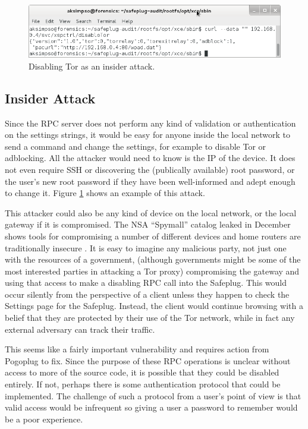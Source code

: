 \documentclass[conference]{IEEEtran}
\begin{document}
\begin{figure}
  \centering
  \includegraphics[width=.75\textwidth]{disabletor}
  \caption{Disabling Tor as an insider attack.}
  \label{disable}
\end{figure}

\subsection{Insider Attack}
Since the RPC server does not perform any kind of validation or authentication on the settings strings, it would be easy for anyone inside the local network to send a command and change the settings, for example to disable Tor or adblocking.  All the attacker would need to know is the IP of the device.  It does not even require SSH or discovering the (publically available) root password, or the user's new root password if they have been well-informed and adept enough to change it.  Figure \ref{disable} shows an example of this attack.

This attacker could also be any kind of device on the local network, or the local gateway if it is compromised.  The NSA ``Spymall'' catalog leaked in December shows tools for compromising a number of different devices and home routers are traditionally insecure \cite{spymall}.  It is easy to imagine any malicious party, not just one with the resources of a government, (although governments might be some of the most interested parties in attacking a Tor proxy) compromising the gateway and using that access to make a disabling RPC call into the Safeplug.  This would occur silently from the perspective of a client unless they happen to check the Settings page for the Safeplug.  Instead, the client would continue browsing with a belief that they are protected by their use of the Tor network, while in fact any external adversary can track their traffic.

This seems like a fairly important vulnerability and requires action from Pogoplug to fix.  Since the purpose of these RPC operations is unclear without access to more of the source code, it is possible that they could be disabled entirely.  If not, perhaps there is some authentication protocol that could be implemented.  The challenge of such a protocol from a user's point of view is that valid access would be infrequent so giving a user a password to remember would be a poor experience.
\end{document}
